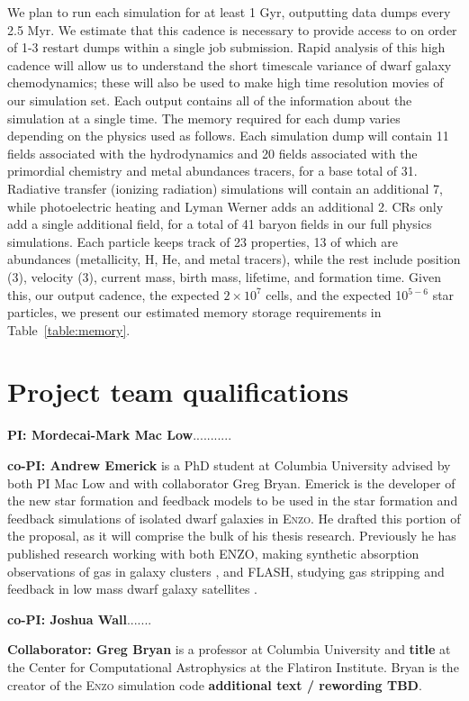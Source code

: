 \documentclass[11pt]{article}
\begin{document}
We plan to run each simulation for at least 1 Gyr, outputting data dumps every 2.5 Myr. We estimate that this cadence is necessary to provide access to on order of 1-3 restart dumps within a single job submission. Rapid analysis of this high cadence will allow us to understand the short timescale variance of dwarf galaxy chemodynamics; these will also be used to make high time resolution movies of our simulation set. Each output contains all of the information about the simulation at a single time. The memory required for each dump varies depending on the physics used as follows. Each simulation dump will contain 11 fields associated with the hydrodynamics and 20 fields associated with the primordial chemistry and metal abundances tracers, for a base total of 31. Radiative transfer (ionizing radiation) simulations will contain an additional 7, while photoelectric heating and Lyman Werner adds an additional 2. CRs only add a single additional field, for a total of 41 baryon fields in our full physics simulations. Each particle keeps track of 23 properties, 13 of which are abundances (metallicity, H, He, and metal tracers), while the rest include position (3), velocity (3), current mass, birth mass, lifetime, and formation time. Given this, our output cadence, the expected $2 \times 10^{7}$ cells, and the expected 10$^{5-6}$ star particles, we present our estimated memory storage requirements in Table~\ref{table:memory}.

\section{Project team qualifications}

\textbf{PI: Mordecai-Mark Mac Low}...........

\textbf{co-PI: Andrew Emerick} is a PhD student at Columbia University advised by both PI Mac Low and with collaborator Greg Bryan. Emerick is the developer of the new star formation and feedback models to be used in the star formation and feedback simulations of isolated dwarf galaxies in \textsc{Enzo}. He drafted this portion of the proposal, as it will comprise the bulk of his thesis research. Previously he has published research working with both \textsc{ENZO}, making synthetic absorption observations of gas in galaxy clusters \citep{Emerick2015}, and \textsc{FLASH}, studying gas stripping and feedback in low mass dwarf galaxy satellites \citep{Emerick2016}.

\textbf{co-PI: Joshua Wall}.......

\textbf{Collaborator: Greg Bryan} is a professor at Columbia University and {\bf title} at the Center for Computational Astrophysics at the Flatiron Institute. Bryan is the creator of the \textsc{Enzo} simulation code {\bf additional text / rewording TBD}.
\end{document}
